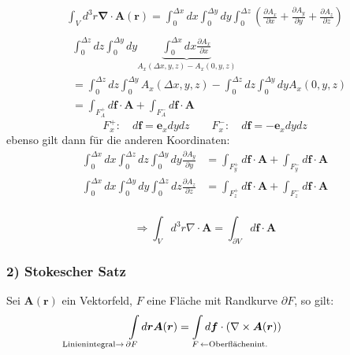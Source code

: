 \documentclass[titlepage,11pt,a4paper,ngerman]{report}
\newcommand{\ub}[1]{\underbrace{#1}}
\renewcommand{\vec}[1]{\boldsymbol{#1}}
\renewcommand{\paragraph}[1]{\subsubsection{#1}}
\begin{document}
\begin{enumerate}[i)]
	\begin{align*}
	\int_V d^3r \vec{\nabla} \cdot \vec{A}(\vec{r})  =  \int_{0}^{\Delta x} dx \int_{0}^{\Delta y} dy \int_{0}^{\Delta z} \left(\frac{\partial A_x}{\partial x} + \frac{\partial A_y}{\partial y} + \frac{\partial A_z}{\partial z}\right)  \\
	\end{align*}
	\begin{align*}
	&\int_{0}^{\Delta z} dz \int_{0}^{\Delta y} dy \ub{\int_{0}^{\Delta x} dx \frac{\partial A_x}{\partial x}}_{A_x(\Delta x , y , z) - A_x(0,y,z)}\\
	& = \int_{0}^{\Delta z} dz \int_{0}^{\Delta y} A_x(\Delta x,y,z) - \int_{0}^{\Delta z} dz \int_{0}^{\Delta y} dy A_x(0,y,z)\\
	& = \int_{F^+_A} d\vec{f} \cdot \vec{A} + \int_{F^-_A} d\vec{f} \cdot \vec{A}
	\end{align*}
	\begin{equation*}
	F_x^+: \quad d\vec{f} = \vec{e}_x dy dz \qquad F_x^-: \quad d\vec{f} = - \vec{e}_x dy dz
	\end{equation*}
	ebenso gilt dann für die anderen Koordinaten:
	\begin{align*}
	\int_{0}^{\Delta x} dx \int_{0}^{\Delta z} dz \int_{0}^{\Delta y} dy \frac{\partial A_y}{\partial y} &= \int_{F^+_y} d\vec{f} \cdot \vec{A} + \int_{F^-_y} d\vec{f} \cdot \vec{A} \\
	\int_{0}^{\Delta x} dx \int_{0}^{\Delta y} dy \int_{0}^{\Delta z} dz \frac{\partial A_z}{\partial z} &= \int_{F^+_z} d\vec{f} \cdot \vec{A} + \int_{F^-_z} d\vec{f} \cdot \vec{A} \\
	\end{align*}
\end{enumerate}

$$\Rightarrow \int_V d^3 r \nabla \cdot \vec{A} = \int_{\partial V} d \vec{f} \cdot \vec{A}$$

\paragraph{2) Stokescher Satz}
Sei $\vec{A}(\vec{r})$ ein Vektorfeld, $F$ eine Fläche mit Randkurve $\partial F$, so gilt:
$$\int\limits_{\mathclap{\textrm{Linienintegral}\rightarrow\,\partial F \phantom{\textrm{Linienintegral}\rightarrow\,}}} d\vec{r} \vec{A}(\vec{r}) = \int\limits_{\mathclap{\phantom{\, \leftarrow \textrm{Oberflächenint.}} F\, \leftarrow \textrm{Oberflächenint.}}} d \vec{f} \cdot (\nabla \times \vec{A}(\vec{r}))$$
\end{document}
